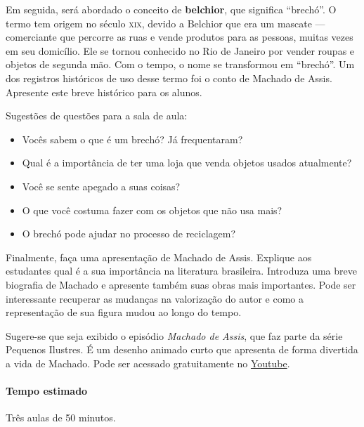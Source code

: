\documentclass[11pt]{extarticle}
\begin{document}
Em seguida, será abordado o conceito de \textbf{belchior}, que significa ``brechó''. O termo tem origem no século \textsc{xix}, devido a Belchior que era um mascate --- comerciante que percorre as ruas e vende produtos para as pessoas, muitas vezes em seu domicílio. Ele se tornou conhecido no Rio de Janeiro por vender roupas e objetos de segunda mão. Com o tempo, o nome se transformou em ``brechó''. Um dos registros históricos de uso desse termo foi o conto de Machado de Assis. Apresente este breve histórico para os alunos.



Sugestões de questões para a sala de aula:

\begin{itemize}

\item Vocês sabem o que é um brechó? Já frequentaram?

\item Qual é a importância de ter uma loja que venda objetos usados atualmente?

\item Você se sente apegado a suas coisas?

\item O que você costuma fazer com os objetos que não usa mais?

\item O brechó pode ajudar no processo de reciclagem?

\end{itemize}

Finalmente, faça uma apresentação de Machado de Assis. Explique aos estudantes qual é a sua importância na literatura brasileira. Introduza uma breve biografia de Machado e apresente também suas obras mais importantes. Pode ser interessante recuperar as mudanças na valorização do autor e como a representação de sua figura mudou ao longo do tempo. 

Sugere-se que seja exibido o episódio \textit{Machado de Assis}, que faz parte da série Pequenos Ilustres. É um desenho animado curto que apresenta de forma divertida a vida de Machado. Pode ser acessado gratuitamente no \href{https://youtu.be/ahafgLr7M0I}{Youtube}.

\paragraph{Tempo estimado} Três aulas de 50 minutos.
\end{document}
